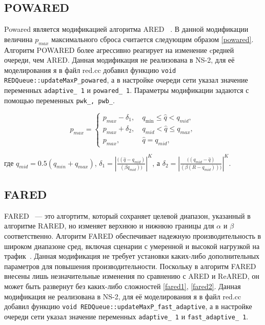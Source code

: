 \subsection{POWARED}


Powared является модификацией алгоритма ARED ~\cite{Powared}. В данной модификации величина $p_{max}$ максимального сброса считается следующим образом \eqref{powared}. Алгоритм POWARED более агрессивно реагирует на изменение cредней очереди, чем ARED. Данная модификация не реализована в NS-2, для её моделирования я в файл red.cc добавил функцию \verb|void REDQueue::updateMaxP_powared|, а в настройке очереди сети указал значение переменных \verb|adaptive_ 1| и \verb|powared_ 1|. 
Параметры модификации задаются с помощью переменных \verb|pwk_, pwb_|.

\begin{equation}
\label{powared}
p_{max} =\begin{cases}
        p_{max}-\delta_1, &  \  q_{\min} \leqslant \hat{q} < q_{mid}, 
        \\
        p_{max}+\delta_2, & \ q_{mid} < \hat{q}  \leqslant q_{max}, 
        \\
        p_{max}, &  \ \hat{q} =  q_{mid},
\end{cases}
\end{equation}

где $q_{mid} = 0.5(q_{min} + q_{max})$, 
$\delta_1 = |\frac{((\hat{q} - q_{mid})}{(\beta q_{mid}))}|^K $, а $\delta_2 = |\frac{((q_{mid} - \hat{q})}{(\beta (R -q_{mid})))}|^K.$


\subsection{FARED}

FARED ~--- это алгортитм, который сохраняет целевой диапазон, указанный в алгоритме RARED, но изменяет верхнюю и нижнюю границы для $\alpha $ и $\beta$ соответственно. Алгоритм FARED обеспечивает надежную производительность в широком диапазоне сред, включая сценарии с умеренной и высокой нагрузкой на трафик~\cite{Tahiliani_2012}.
Данная модификация не требует установки каких-либо дополнительных параметров для повышения производительности. Поскольку в алгоритм FARED внесены лишь незначительные изменения по сравнению
с ARED и ReARED, он может быть развернут без каких-либо сложностей \eqref{fared1}, \eqref{fared2}. Данная модификация не реализована в NS-2, для её моделирования я в файл red.cc добавил функцию \verb|void REDQueue::updateMaxP_fast_adaptive|, а в настройке очереди сети указал значение переменных \verb|adaptive_ 1| 
и \verb|fast_adaptive_ 1|. 

